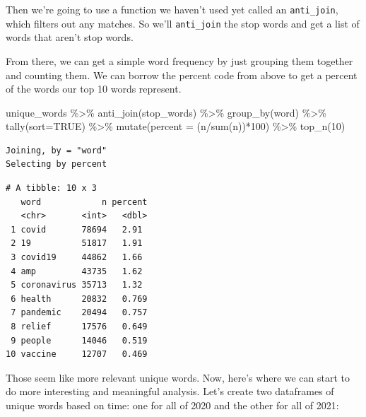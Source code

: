 \documentclass[
  letterpaper,
  DIV=11,
  numbers=noendperiod]{scrreprt}
\newenvironment{Shaded}{\begin{snugshade}}{\end{snugshade}}
\newcommand{\AttributeTok}[1]{\textcolor[rgb]{0.40,0.45,0.13}{#1}}
\newcommand{\ConstantTok}[1]{\textcolor[rgb]{0.56,0.35,0.01}{#1}}
\newcommand{\DecValTok}[1]{\textcolor[rgb]{0.68,0.00,0.00}{#1}}
\newcommand{\FunctionTok}[1]{\textcolor[rgb]{0.28,0.35,0.67}{#1}}
\newcommand{\NormalTok}[1]{\textcolor[rgb]{0.00,0.23,0.31}{#1}}
\newcommand{\SpecialCharTok}[1]{\textcolor[rgb]{0.37,0.37,0.37}{#1}}
\begin{document}
Then we're going to use a function we haven't used yet called an
\texttt{anti\_join}, which filters out any matches. So we'll
\texttt{anti\_join} the stop words and get a list of words that aren't
stop words.

From there, we can get a simple word frequency by just grouping them
together and counting them. We can borrow the percent code from above to
get a percent of the words our top 10 words represent.

\begin{Shaded}
\begin{Highlighting}[]
\NormalTok{unique\_words }\SpecialCharTok{\%\textgreater{}\%}
  \FunctionTok{anti\_join}\NormalTok{(stop\_words) }\SpecialCharTok{\%\textgreater{}\%}
  \FunctionTok{group\_by}\NormalTok{(word) }\SpecialCharTok{\%\textgreater{}\%}
  \FunctionTok{tally}\NormalTok{(}\AttributeTok{sort=}\ConstantTok{TRUE}\NormalTok{) }\SpecialCharTok{\%\textgreater{}\%}
  \FunctionTok{mutate}\NormalTok{(}\AttributeTok{percent =}\NormalTok{ (n}\SpecialCharTok{/}\FunctionTok{sum}\NormalTok{(n))}\SpecialCharTok{*}\DecValTok{100}\NormalTok{) }\SpecialCharTok{\%\textgreater{}\%}
  \FunctionTok{top\_n}\NormalTok{(}\DecValTok{10}\NormalTok{)}
\end{Highlighting}
\end{Shaded}

\begin{verbatim}
Joining, by = "word"
Selecting by percent
\end{verbatim}

\begin{verbatim}
# A tibble: 10 x 3
   word            n percent
   <chr>       <int>   <dbl>
 1 covid       78694   2.91 
 2 19          51817   1.91 
 3 covid19     44862   1.66 
 4 amp         43735   1.62 
 5 coronavirus 35713   1.32 
 6 health      20832   0.769
 7 pandemic    20494   0.757
 8 relief      17576   0.649
 9 people      14046   0.519
10 vaccine     12707   0.469
\end{verbatim}

Those seem like more relevant unique words. Now, here's where we can
start to do more interesting and meaningful analysis. Let's create two
dataframes of unique words based on time: one for all of 2020 and the
other for all of 2021:
\end{document}
